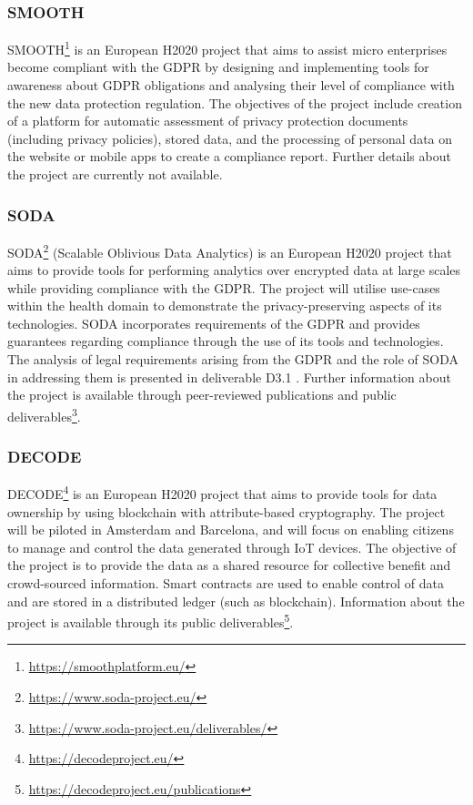 \subsubsection{SMOOTH}
SMOOTH\footnote{\url{https://smoothplatform.eu/}} is an European H2020 project that aims to assist micro enterprises become compliant with the GDPR by designing and implementing tools for awareness about GDPR obligations and analysing their level of compliance with the new data protection regulation.
The objectives of the project include creation of a platform for automatic assessment of privacy protection documents (including privacy policies), stored data, and the processing of personal data on the website or mobile apps to create a compliance report. Further details about the project are currently not available.

\subsubsection{SODA}
SODA\footnote{\url{https://www.soda-project.eu/}} (Scalable Oblivious Data Analytics) is an European H2020 project that aims to provide tools for performing analytics over encrypted data at large scales while providing compliance with the GDPR. The project will utilise use-cases within the health domain to demonstrate the privacy-preserving aspects of its technologies. SODA incorporates requirements of the GDPR and provides guarantees regarding compliance through the use of its tools and technologies. The analysis of legal requirements arising from the GDPR and the role of SODA in addressing them is presented in deliverable D3.1 \cite{spindler_d3.1_2017}. Further information about the project is available through peer-reviewed publications and public deliverables\footnote{\url{https://www.soda-project.eu/deliverables/}}.

\subsubsection{DECODE}
DECODE\footnote{\url{https://decodeproject.eu/}} is an European H2020 project that aims to provide tools for data ownership by using blockchain with attribute-based cryptography. The project will be piloted in Amsterdam and Barcelona, and will focus on enabling citizens to manage and control the data generated through IoT devices. The objective of the project is to provide the data as a shared resource for collective benefit and crowd-sourced information. Smart contracts are used to enable control of data and are stored in a distributed ledger (such as blockchain). Information about the project is available through its public deliverables\footnote{\url{https://decodeproject.eu/publications}}.

